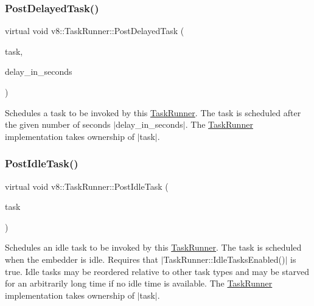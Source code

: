 \subsubsection{\texorpdfstring{Post\+Delayed\+Task()}{PostDelayedTask()}}
{\footnotesize\ttfamily virtual void v8\+::\+Task\+Runner\+::\+Post\+Delayed\+Task (\begin{DoxyParamCaption}\item[{std\+::unique\+\_\+ptr$<$ \mbox{\hyperlink{classv8_1_1Task}{Task}} $>$}]{task,  }\item[{double}]{delay\+\_\+in\+\_\+seconds }\end{DoxyParamCaption})\hspace{0.3cm}{\ttfamily [pure virtual]}}

Schedules a task to be invoked by this \mbox{\hyperlink{classv8_1_1TaskRunner}{Task\+Runner}}. The task is scheduled after the given number of seconds $\vert$delay\+\_\+in\+\_\+seconds$\vert$. The \mbox{\hyperlink{classv8_1_1TaskRunner}{Task\+Runner}} implementation takes ownership of $\vert$task$\vert$. \mbox{\label{classv8_1_1TaskRunner_a0ebfb362d1cb3fa621f0f50b9ff0fb6f}} 
\subsubsection{\texorpdfstring{Post\+Idle\+Task()}{PostIdleTask()}}
{\footnotesize\ttfamily virtual void v8\+::\+Task\+Runner\+::\+Post\+Idle\+Task (\begin{DoxyParamCaption}\item[{std\+::unique\+\_\+ptr$<$ \mbox{\hyperlink{classv8_1_1IdleTask}{Idle\+Task}} $>$}]{task }\end{DoxyParamCaption})\hspace{0.3cm}{\ttfamily [pure virtual]}}

Schedules an idle task to be invoked by this \mbox{\hyperlink{classv8_1_1TaskRunner}{Task\+Runner}}. The task is scheduled when the embedder is idle. Requires that $\vert$\+Task\+Runner\+::\+Idle\+Tasks\+Enabled()$\vert$ is true. Idle tasks may be reordered relative to other task types and may be starved for an arbitrarily long time if no idle time is available. The \mbox{\hyperlink{classv8_1_1TaskRunner}{Task\+Runner}} implementation takes ownership of $\vert$task$\vert$. \mbox{\label{classv8_1_1TaskRunner_ab2b73f380765e09c9ae401182a92d8e9}} 

